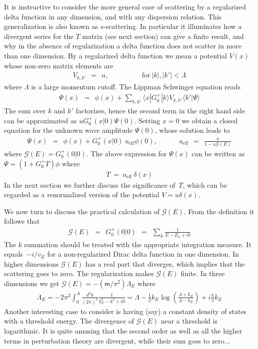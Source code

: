 \documentclass[onecolumn,fleqn, 11pt]{revtex4}
\newcommand{\mass}{\mathsf{m}}
\newcommand{\tbox}[1]{\text{#1}}
\newcommand{\beq}{\begin{eqnarray}}
\newcommand{\eeq}{\end{eqnarray}}
\begin{document}
It is instructive to consider the more general case of 
scattering  by a regularized delta function in any dimension, 
and with any dispersion relation. 
This generalization is also known as $s$-scattering.
In particular it illuminates how a divergent 
series for the $T$ matrix (see next section) can give a finite result, 
and why in the absence of regularization 
a delta function does not scatter in more 
than one dimension. By a regularized delta function 
we mean a potential $V(x)$ whose non-zero matrix elements are 
\beq
V_{k,k'} \ \ = \ \ u,
\hspace{2cm} \text{for} \ |k|,|k'| < \Lambda 
\eeq
where $\Lambda$ is a large momentum cutoff.  
The Lippman Schwinger equation reads 
\beq
\Psi(x) \ \ = \ \ \phi(x) +  \sum_{k,k'}   \langle x|G_0^{+}|k \rangle  V_{k,k'} \langle k'|\Psi\rangle 
\eeq
The sum over $k$ and $k'$ factorizes, hence the second term 
in the right hand side can be approximated as $uG_0^{+}(x|0)\Psi(0)$.
Setting $x=0$ we obtain a closed equation for the unknown 
wave amplitude $\Psi(0)$, whose solution leads to  
\beq
\Psi(x) \ \ = \ \ \phi(x) + G_0^{+}(x|0) \ u_{\tbox{eff}} \phi(0), 
\ \ \ \ \ \ \ \ \ \ \ \ \ \  
u_{\tbox{eff}} \ \ = \ \ \frac{u}{1-u\mathcal{G}(E)}
\eeq
where $\mathcal{G}(E) = G_0^{+}(0|0)$.  
The above expression for $\Psi(x)$ can be written as ${\Psi=(1+G_0^{+}T)\phi}$ where 
\beq
T \  = \ u_{\tbox{eff}} \ \delta(x)
\eeq
In the next section we further discuss the significance of~$T$, 
which can be regarded as a renormalized version of the potential ${V=u\delta(x)}$.


We now turn to discuss the practical calculation 
of ${\mathcal{G}(E)}$. From the definition it follows that 
\beq
\mathcal{G}(E) \ \ = \ \  G_0^{+}(0|0)  \ \ = \ \ \sum_k \frac{1}{E-E_k+i0} 
\eeq
The $k$ summation should be treated with the appropriate integration measure.
It equals~$-i/v_E$ for a non-regularized Dirac delta function 
in one dimension.  
In higher dimensions $\mathcal{G}(E)$
has a real part that diverges, 
which implies that the scattering goes 
to zero.  The regularization makes $\mathcal{G}(E)$ 
finite. In three dimensions we 
get $\mathcal{G}(E)=-(\mass/\pi^2)\Lambda_E$ where 
\beq
\Lambda_E = 
-2\pi^2 
\int_0^{\Lambda} 
\frac{d^3k}{(2\pi)^3} 
\frac{1}{k_E^2-k^2+i0} 
= 
\Lambda
-\frac{1}{2}k_E\log\left(\frac{\Lambda+k_E}{\Lambda-k_E}\right)
+i\frac{\pi}{2}k_E 
\eeq
Another interesting case to consider is having  
(say) a constant density of states with a threshold energy. 
The divergence of $\mathcal{G}(E)$ near a threshold 
is logarithmic.  It is quite amusing that 
the second order as well as all the higher 
terms in perturbation theory are divergent, 
while their sum goes to zero... 
\end{document}
